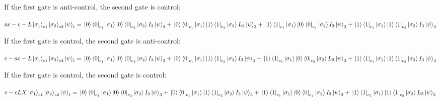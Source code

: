 \documentclass[12pt]{article}
\begin{document}
\begin{enumerate}
          If the first gate is anti-control, the second gate is control:

          $
              ac-c-L\ket{\sigma_1}_{c1}\ket{\sigma_2}_{c2}\ket{\psi}_t=
              \\\ket{0}\bra{0}_{c_1}\ket{\sigma_1}\ket{0}\bra{0}_{c_2}\ket{\sigma_2}I_3\ket{\psi}_3+
              \\\ket{0}\bra{0}_{c_1}\ket{\sigma_1}\ket{1}\bra{1}_{c_2}\ket{\sigma_2}L_3\ket{\psi}_3+
              \\\ket{1}\bra{1}_{c_1}\ket{\sigma_1}\ket{0}\bra{0}_{c_2}\ket{\sigma_2}I_3\ket{\psi}_3+
              \\\ket{1}\bra{1}_{c_1}\ket{\sigma_1}\ket{1}\bra{1}_{c_2}\ket{\sigma_2}I_3\ket{\psi}_3
          $

          If the first gate is control, the second gate is anti-control:

          $
              c-ac-L\ket{\sigma_1}_{c1}\ket{\sigma_2}_{c2}\ket{\psi}_t=
              \\\ket{0}\bra{0}_{c_1}\ket{\sigma_1}\ket{0}\bra{0}_{c_2}\ket{\sigma_2}I_3\ket{\psi}_3+
              \\\ket{0}\bra{0}_{c_1}\ket{\sigma_1}\ket{1}\bra{1}_{c_2}\ket{\sigma_2}I_3\ket{\psi}_3+
              \\\ket{1}\bra{1}_{c_1}\ket{\sigma_1}\ket{0}\bra{0}_{c_2}\ket{\sigma_2}L_3\ket{\psi}_3+
              \\\ket{1}\bra{1}_{c_1}\ket{\sigma_1}\ket{1}\bra{1}_{c_2}\ket{\sigma_2}I_3\ket{\psi}_3
          $


          If the first gate is control, the second gate is control:

          $
              c-cLX\ket{\sigma_1}_{c1}\ket{\sigma_2}_{c2}\ket{\psi}_t=
              \\\ket{0}\bra{0}_{c_1}\ket{\sigma_1}\ket{0}\bra{0}_{c_2}\ket{\sigma_2}I_3\ket{\psi}_3+
              \\\ket{0}\bra{0}_{c_1}\ket{\sigma_1}\ket{1}\bra{1}_{c_2}\ket{\sigma_2}I_3\ket{\psi}_3+
              \\\ket{1}\bra{1}_{c_1}\ket{\sigma_1}\ket{0}\bra{0}_{c_2}\ket{\sigma_2}I_3\ket{\psi}_3+
              \\\ket{1}\bra{1}_{c_1}\ket{\sigma_1}\ket{1}\bra{1}_{c_2}\ket{\sigma_2}L_3\ket{\psi}_3
          $


\end{enumerate}
\end{document}

